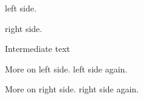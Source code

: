 \documentclass[12pt]{article}
\begin{document}
\begin{pages}
  \begin{Leftside}
    \beginnumbering
    \pstart
       left side. \lipsum[1-3]
    \pend
    \pstart
      \lipsum[4]
    \pend
    \endnumbering
  \end{Leftside}
  \begin{Rightside}
    \beginnumbering
    \pstart
       right side.\lipsum[1-3]
    \pend
    \pstart
      \lipsum[4]
    \pend
    \endnumbering
  \end{Rightside}
\end{pages}
\Pages

Intermediate text
\begin{pages}
  \begin{Leftside}
    \beginnumbering
    \pstart
      More on  left side. \lipsum[1-3] %
    \pend
    \pstart
       left side again.\lipsum[4-7] %
    \pend
    \endnumbering
  \end{Leftside}
  \begin{Rightside}
    \beginnumbering
    \pstart
      More on  right side. \lipsum[1-3] %
    \pend
    \pstart
       right side again.\lipsum[4-7] %
    \pend
    \endnumbering
  \end{Rightside}
\end{pages}
\Pages
\end{document}
